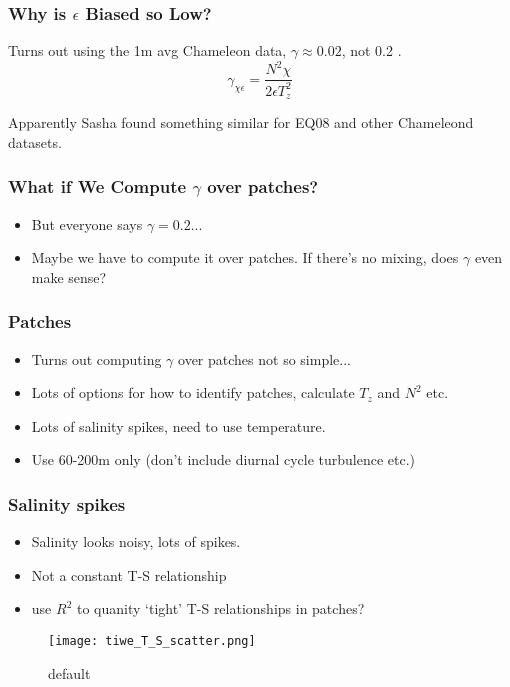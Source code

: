 \documentclass{beamer}
\begin{document}
\begin{frame}
 \frametitle{Why is $\epsilon$ Biased so Low?}

Turns out using the 1m avg Chameleon data, $\gamma \approx 0.02$, not 0.2  .
\begin{equation}
\gamma_{\chi\epsilon}=\frac{N^2 \chi}{2\epsilon T_{z}^{2}} 
\end{equation}

Apparently Sasha found something similar for EQ08 and other Chameleond datasets.

\end{frame}



\begin{frame}
 \frametitle{What if We Compute $\gamma$ over patches?}
\begin{itemize}
\item But everyone says $\gamma=0.2$...
\item Maybe we have to compute it over patches. If there's no mixing, does $\gamma$ even make sense?
\end{itemize}

\end{frame}





\begin{frame}
 \frametitle{Patches}
\begin{itemize}
\item Turns out computing $\gamma$ over patches not so simple...
\item Lots of options for how to identify patches, calculate $T_z$ and $N^2$ etc.
\item Lots of salinity spikes, need to use temperature.
\item Use 60-200m only (don't include diurnal cycle turbulence etc.)
\end{itemize}

\end{frame}



\begin{frame}
 \frametitle{Salinity spikes}
\begin{itemize}
\item Salinity looks noisy, lots of spikes.
\item Not a constant T-S relationship 
\item use $R^2$ to quanity `tight' T-S relationships in patches?
\end{itemize}


\begin{figure}[htbp]
\begin{center}
\texttt{[image: tiwe\_T\_S\_scatter.png]}
\caption{default}
\label{default}
\end{center}
\end{figure}


\end{frame}
\end{document}
